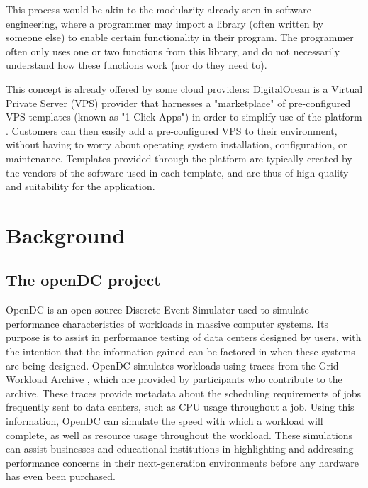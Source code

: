 \documentclass[11pt]{article}
\begin{document}
This process would be akin to the modularity already seen in software engineering, where a programmer may import a library (often written by someone else) to enable certain functionality in their program. 
The programmer often only uses one or two functions from this library, and do not necessarily understand how these functions work (nor do they need to).

This concept is already offered by some cloud providers: DigitalOcean is a Virtual Private Server (VPS) provider that harnesses a "marketplace" of pre-configured VPS templates (known as "1-Click Apps") in order to simplify use of the platform \cite{DigitalOcean2020}. 
Customers can then easily add a pre-configured VPS to their environment, without having to worry about operating system installation, configuration, or maintenance. 
Templates provided through the platform are typically created by the vendors of the software used in each template, and are thus of high quality and suitability for the application.

\newpage

\section{Background} \label{sec:background}

	\subsection{The openDC project}
		OpenDC is an open-source Discrete Event Simulator used to simulate performance characteristics of workloads in massive computer systems. 
		Its purpose is to assist in performance testing of data centers designed by users, with the intention that the information gained can be factored in when these systems are being designed. 
		OpenDC simulates workloads using traces from the Grid Workload Archive \cite{Iosup2008}, which are provided by participants who contribute to the archive. 
		These traces provide metadata about the scheduling requirements of jobs frequently sent to data centers, such as CPU usage throughout a job. 
		Using this information, OpenDC can simulate the speed with which a workload will complete, as well as resource usage throughout the workload. 
		These simulations can assist businesses and educational institutions in highlighting and addressing performance concerns in their next-generation environments before any hardware has even been purchased.
\end{document}
